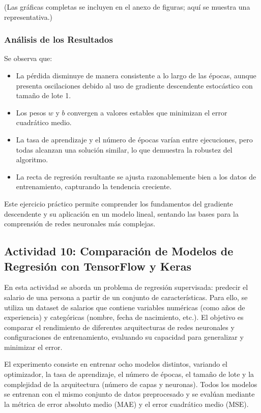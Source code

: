 \documentclass[12pt]{article}
\begin{document}
(Las gráficas completas se incluyen en el anexo de figuras; aquí se muestra una representativa.)

\subsubsection*{Análisis de los Resultados}

Se observa que:

\begin{itemize}
    \item La pérdida disminuye de manera consistente a lo largo de las épocas, aunque presenta oscilaciones debido al uso de gradiente descendente estocástico con tamaño de lote 1.
    \item Los pesos $w$ y $b$ convergen a valores estables que minimizan el error cuadrático medio.
    \item La tasa de aprendizaje y el número de épocas varían entre ejecuciones, pero todas alcanzan una solución similar, lo que demuestra la robustez del algoritmo.
    \item La recta de regresión resultante se ajusta razonablemente bien a los datos de entrenamiento, capturando la tendencia creciente.
\end{itemize}

Este ejercicio práctico permite comprender los fundamentos del gradiente descendente y su aplicación en un modelo lineal, sentando las bases para la comprensión de redes neuronales más complejas.
\subsection{Actividad 10: Comparación de Modelos de Regresión con TensorFlow y Keras}

En esta actividad se aborda un problema de regresión supervisada: predecir el salario de una persona a partir de un conjunto de características. Para ello, se utiliza un dataset de salarios que contiene variables numéricas (como años de experiencia) y categóricas (nombre, fecha de nacimiento, etc.). El objetivo es comparar el rendimiento de diferentes arquitecturas de redes neuronales y configuraciones de entrenamiento, evaluando su capacidad para generalizar y minimizar el error.

El experimento consiste en entrenar ocho modelos distintos, variando el optimizador, la tasa de aprendizaje, el número de épocas, el tamaño de lote y la complejidad de la arquitectura (número de capas y neuronas). Todos los modelos se entrenan con el mismo conjunto de datos preprocesado y se evalúan mediante la métrica de error absoluto medio (MAE) y el error cuadrático medio (MSE).
\end{document}
